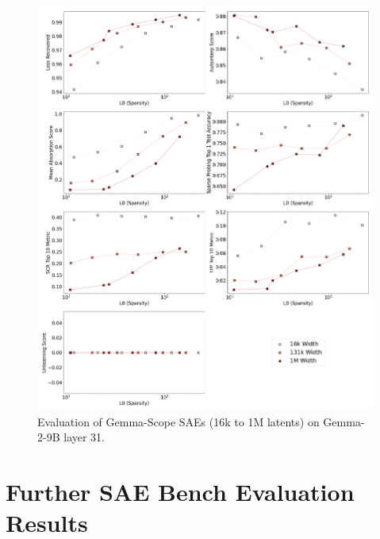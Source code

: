 \documentclass{article}
\theoremstyle{plain}
\theoremstyle{definition}
\theoremstyle{remark}
\begin{document}
\begin{figure}[h!]
    \centering
    \includegraphics[width=\columnwidth]{images/gemma-scope/plot_2x4_gemma-scope_gemma-2-9b_width_series_layer_31.png}
    \caption{Evaluation of Gemma-Scope SAEs (16k to 1M latents) on Gemma-2-9B layer 31.}
\end{figure}

\clearpage
\section{Further SAE Bench Evaluation Results}
\label{app:sae_bench_eval_results}
\end{document}

